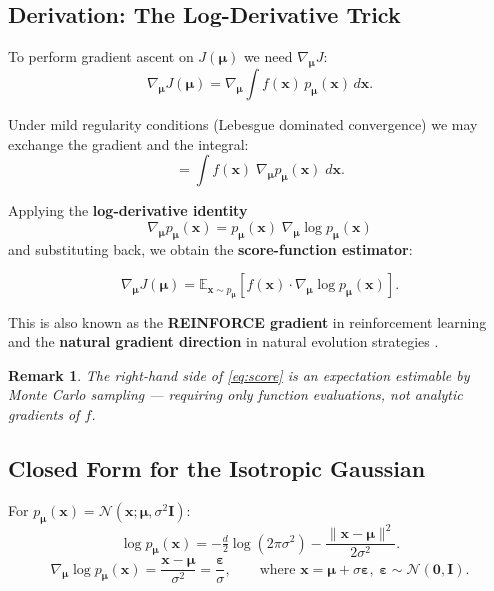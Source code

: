 \documentclass[12pt, a4paper]{article}
\newtheorem{remark}{Remark}[section]
\newcommand{\bmu}{\boldsymbol{\mu}}
\newcommand{\beps}{\boldsymbol{\varepsilon}}
\newcommand{\bx}{\mathbf{x}}
\newcommand{\EE}{\mathbb{E}}
\newcommand{\NN}{\mathcal{N}}
\begin{document}
\subsection{Derivation: The Log-Derivative Trick}

To perform gradient ascent on $J(\bmu)$ we need $\nabla_{\bmu} J$:
\begin{equation}
  \nabla_{\bmu} J(\bmu)
  = \nabla_{\bmu} \int f(\bx)\, p_{\bmu}(\bx)\, d\bx.
\end{equation}

Under mild regularity conditions (Lebesgue dominated convergence)
we may exchange the gradient and the integral:
\begin{equation}
  = \int f(\bx)\;\nabla_{\bmu} p_{\bmu}(\bx)\; d\bx.
\end{equation}

Applying the \textbf{log-derivative identity}
\begin{equation}
  \nabla_{\bmu} p_{\bmu}(\bx)
  = p_{\bmu}(\bx)\;\nabla_{\bmu} \log p_{\bmu}(\bx)
  \label{eq:logderiv}
\end{equation}
and substituting back, we obtain the \textbf{score-function estimator}:

\begin{keyresult}
  \begin{equation}
    \nabla_{\bmu} J(\bmu)
    = \EE_{\bx \sim p_{\bmu}}\!
      \left[f(\bx)\cdot \nabla_{\bmu} \log p_{\bmu}(\bx)\right].
    \label{eq:score}
  \end{equation}
\end{keyresult}

\noindent
This is also known as the \textbf{REINFORCE gradient} in reinforcement
learning \cite{williams1992} and the \textbf{natural gradient direction}
in natural evolution strategies \cite{wierstra2008, wierstra2014}.

\begin{remark}
  The right-hand side of \eqref{eq:score} is an expectation estimable by
  Monte Carlo sampling --- requiring \emph{only function evaluations},
  not analytic gradients of $f$.
\end{remark}

\subsection{Closed Form for the Isotropic Gaussian}

For $p_{\bmu}(\bx) = \NN(\bx;\bmu,\sigma^2\mathbf{I})$:
\begin{equation}
  \log p_{\bmu}(\bx)
  = -\tfrac{d}{2}\log(2\pi\sigma^2)
    - \frac{\|\bx - \bmu\|^2}{2\sigma^2}.
\end{equation}
\begin{equation}
  \nabla_{\bmu} \log p_{\bmu}(\bx)
  = \frac{\bx - \bmu}{\sigma^2}
  = \frac{\beps}{\sigma},
  \qquad
  \text{where } \bx = \bmu + \sigma\beps,\;
  \beps \sim \NN(\mathbf{0}, \mathbf{I}).
\end{equation}
\end{document}
